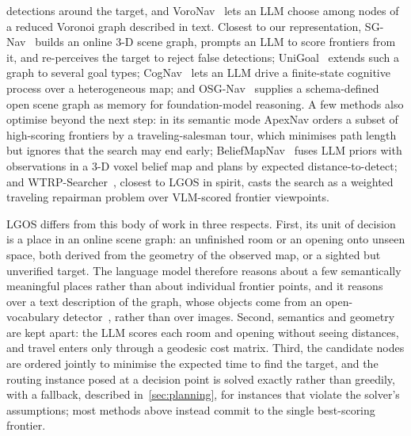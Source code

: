 \documentclass[10pt]{article}
\newcommand{\ours}{LGOS\xspace}
\begin{document}
detections around the target, and VoroNav~\citep{wu2024voronav} lets an LLM choose among nodes of a reduced
Voronoi graph described in text. Closest to our representation, SG-Nav~\citep{yin2024sg} builds an online
3-D scene graph, prompts an LLM to score frontiers from it, and re-perceives the target to reject false
detections; UniGoal~\citep{yin2025unigoal} extends such a graph to several goal types;
CogNav~\citep{cao2025cognav} lets an LLM drive a finite-state cognitive process over a heterogeneous map;
and OSG-Nav~\citep{loo2025open} supplies a schema-defined open scene graph as memory for foundation-model
reasoning. A few methods also optimise beyond the next step: in its semantic mode ApexNav orders a subset
of high-scoring frontiers by a traveling-salesman tour, which minimises path length but ignores that the
search may end early; BeliefMapNav~\citep{zhou2025beliefmapnav} fuses LLM priors with observations in a
3-D voxel belief map and plans by expected distance-to-detect; and WTRP-Searcher~\citep{liu2026global},
closest to \ours in spirit, casts the search as a weighted traveling repairman problem over VLM-scored
frontier viewpoints.

\ours differs from this body of work in three respects. First, its unit of decision is a place in an
online scene graph: an unfinished room or an opening onto unseen space, both derived from the geometry of
the observed map, or a sighted but unverified target. The language model therefore reasons about a few
semantically meaningful places rather than about individual frontier points, and it reasons over a text
description of the graph, whose objects come from an open-vocabulary detector~\citep{cheng2024yolo},
rather than over images. Second, semantics and geometry are kept apart: the LLM scores each room and
opening without seeing distances, and travel enters only through a geodesic cost matrix. Third, the
candidate nodes are ordered jointly to minimise the expected time to find the target, and the routing
instance posed at a decision point is solved exactly rather than greedily, with a fallback, described
in~\cref{sec:planning}, for instances that violate the solver's assumptions; most methods above instead
commit to the single best-scoring frontier.
\end{document}
